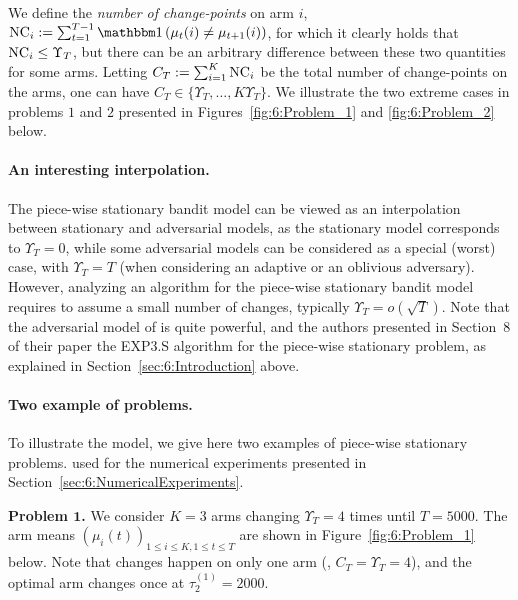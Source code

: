 We define the \emph{number of change-points} on arm $i$,
$\NCi := \sum_{t=1}^{T-1} \indic\left(\mu_t(i) \neq \mu_{t+1}(i)\right)$,
for which it clearly holds that
$\text{NC}_i \leq \Upsilon_T$, but there can be an arbitrary difference between these two quantities for some arms. Letting $C_T := \sum_{i=1}^K \text{NC}_i$ be the total number of change-points on the arms, one can have $C_T \in \{ \Upsilon_T, \dots, K\Upsilon_T \}$.
We illustrate the two extreme cases in problems $1$ and $2$ presented in Figures~\ref{fig:6:Problem_1} and \ref{fig:6:Problem_2} below.


\paragraph{An interesting interpolation.}
%
The piece-wise stationary bandit model can be viewed as an interpolation between stationary and adversarial models, as the stationary model corresponds to $\Upsilon_T = 0$, while some adversarial models can be considered as a special (worst) case, with $\Upsilon_T = T$ (when considering an adaptive or an oblivious adversary).
However, analyzing an algorithm for the piece-wise stationary bandit model requires to assume a small number of changes, typically $\Upsilon_T = o(\sqrt{T})$.
Note that the adversarial model of \cite{Auer02NonStochastic} is quite powerful, and the authors presented in Section~8 of their paper the EXP3.S algorithm for the piece-wise stationary problem, as explained in Section~\ref{sec:6:Introduction} above.


\paragraph{Two example of problems.}\label{par:6:benchmark1}

To illustrate the model, we give here two examples of piece-wise stationary problems.
used for the numerical experiments presented in Section~\ref{sec:6:NumericalExperiments}.

\textbf{Problem $\bm 1$.}
We consider $K=3$ arms changing $\Upsilon_T=4$ times until $T=5000$.
The arm means $(\mu_i(t))_{1\leq i\leq K,1\leq t\leq T}$ are shown in Figure~\ref{fig:6:Problem_1} below.
Note that changes happen on only one arm (\ie, $C_T=\Upsilon_T=4$),
and the optimal arm changes once at $\tau_2^{(1)}=2000$.

